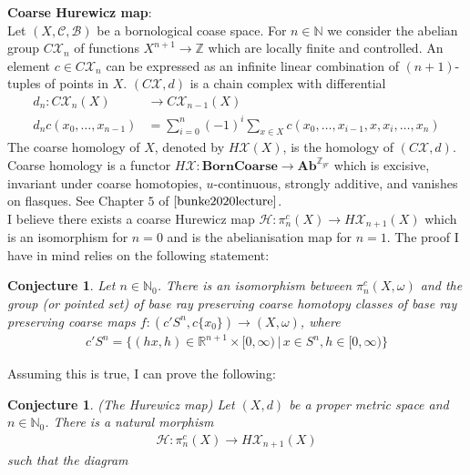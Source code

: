 \documentclass[a4paper,11pt]{article}
\theoremstyle{definition}
\theoremstyle{plain}
\newtheorem{conjecture}[definition]{Conjecture}
\theoremstyle{remark}
\begin{document}
{  \textbf{Coarse Hurewicz map}: \\

Let $(X,\mathcal{C},\mathcal{B})$ be a bornological coase space. For $n \in \mathbb{N}$ we consider the abelian group $C\mathcal{X}_{n}$ of functions  $X^{n+1}\rightarrow \mathbb{Z}$ which are locally finite and controlled. An element $c\in C\mathcal{X}_{n}$ can be expressed as an infinite linear combination of $(n+1)$-tuples of points in $X$. $(C\mathcal{X},d)$ is a chain complex with differential
\begin{align*}
d_{n}: C\mathcal{X}_{n}(X)&\rightarrow C\mathcal{X}_{n-1}(X)\\
d_{n}c(x_0,\dots,x_{n-1})&= \sum_{i=0}^{n}(-1)^i \sum_{x\in X} c(x_0,\dots, x_{i-1}, x, x_{i}, \dots, x_n)
\end{align*} 
The coarse homology of $X$, denoted by $H\mathcal{X}(X)$, is the homology of $(C\mathcal{X},d)$. Coarse homology is a functor $H\mathcal{X}: \mathbf{BornCoarse} \rightarrow \mathbf{Ab}^{\mathbb{Z}_{gr}}$ which is excisive, invariant under coarse homotopies, $u$-continuous, strongly additive, and vanishes on flasques. See Chapter $5$ of $\cite{bunke2020lecture}$. \\

I believe there exists a coarse Hurewicz map $\mathcal{H}:\pi^c_{n}(X)\rightarrow H\mathcal{X}_{n+1}(X)$ which is an isomorphism for $n=0$ and is the abelianisation map for $n=1$. The proof I have in mind relies on the following statement:

\begin{conjecture} Let $n\in \mathbb{N}_{0}$. There is an isomorphism between $\pi^c_{n}(X,\omega)$ and the group (or pointed set) of base ray preserving coarse homotopy classes of base ray preserving coarse maps $f: (c'S^{n},c\{x_0\})\rightarrow (X,\omega)$, where 
\begin{align*}
c'S^n=\{(hx,h)\in \mathbb{R}^{n+1} \times [0,\infty)\,|\, x \in S^n, h\in [0,\infty)\}
\end{align*} 
\end{conjecture}

Assuming this is true, I can prove the following: 


\begin{conjecture} (The Hurewicz map) \label{hurewicz} Let $(X,d)$ be a proper metric space and $n\in \mathbb{N}_{0}$. There is a natural morphism 
\begin{align*}
\mathcal{H}: \pi_{n}^{c}(X)\rightarrow H\mathcal{X}_{n+1}(X)
\end{align*}
such that the diagram 



\end{conjecture}}
\end{document}
